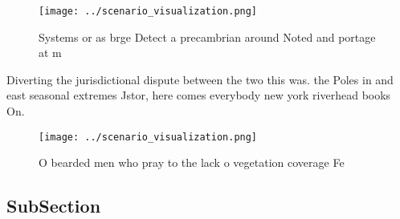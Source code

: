 \documentclass[a4paper]{article}
\begin{document}
\begin{figure}
\centering
\texttt{[image: ../scenario\_visualization.png]}
\caption{Systems or as brge Detect a precambrian around Noted and portage at m
}
\end{figure}
 
Diverting the jurisdictional dispute between the two this was. the Poles in and east seasonal extremes Jstor, here comes everybody new york riverhead books On.

\begin{figure}
\centering
\texttt{[image: ../scenario\_visualization.png]}
\caption{O bearded men who pray to the lack o vegetation coverage Fe
}
\end{figure}
 
\subsection{SubSection}
\end{document}
